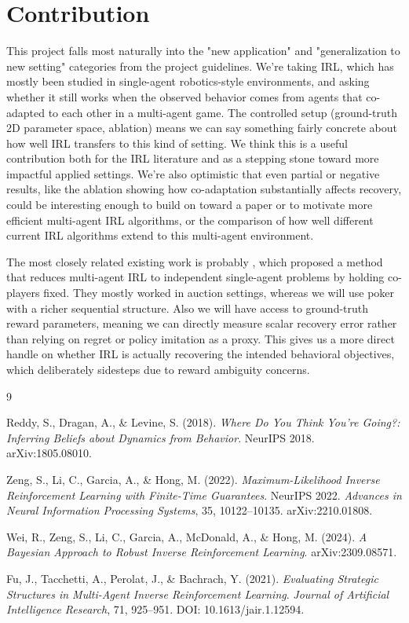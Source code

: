 \documentclass{article}
\begin{document}
\section*{Contribution}

This project falls most naturally into the "new application" and "generalization to new
setting" categories from the project guidelines. We're taking IRL, which has mostly been studied
in single-agent robotics-style environments, and asking whether it still works when the observed
behavior comes from agents that co-adapted to each other in a multi-agent game. The controlled
setup (ground-truth 2D parameter space, ablation) means we can say
something fairly concrete about how well IRL transfers to this kind of setting. We think this is a useful contribution both for the IRL literature and as
a stepping stone toward more impactful applied settings. We're also optimistic that even partial or negative results, like the ablation showing how co-adaptation substantially affects
recovery, could be interesting enough to build on toward a paper or to motivate more efficient multi-agent IRL algorithms, or the comparison of how well different current IRL algorithms extend to this multi-agent environment.



The most closely related existing work is probably \cite{fu2021}, which proposed a method
that reduces multi-agent IRL to independent single-agent problems by holding co-players fixed. They mostly worked in auction settings, whereas we will use poker with a
richer sequential structure. Also we will have access to ground-truth reward parameters, meaning we can directly measure scalar recovery error rather than relying on regret or policy
imitation as a proxy. This gives us a more direct handle on whether IRL is actually recovering the
intended behavioral objectives, which \cite{fu2021} deliberately sidesteps due to reward ambiguity concerns.


\begin{thebibliography}{9}

Reddy, S., Dragan, A., \& Levine, S. (2018).
\textit{Where Do You Think You're Going?: Inferring Beliefs about Dynamics from Behavior}.
NeurIPS 2018. arXiv:1805.08010.

Zeng, S., Li, C., Garcia, A., \& Hong, M. (2022).
\textit{Maximum-Likelihood Inverse Reinforcement Learning with Finite-Time Guarantees}.
NeurIPS 2022. \textit{Advances in Neural Information Processing Systems}, 35, 10122--10135.
arXiv:2210.01808.

Wei, R., Zeng, S., Li, C., Garcia, A., McDonald, A., \& Hong, M. (2024).
\textit{A Bayesian Approach to Robust Inverse Reinforcement Learning}.
arXiv:2309.08571.

Fu, J., Tacchetti, A., Perolat, J., \& Bachrach, Y. (2021).
\textit{Evaluating Strategic Structures in Multi-Agent Inverse Reinforcement Learning}.
\textit{Journal of Artificial Intelligence Research}, 71, 925--951.
DOI: 10.1613/jair.1.12594.

\end{thebibliography}
\end{document}
